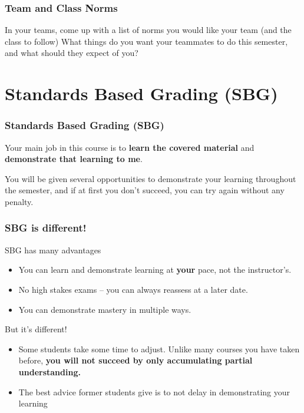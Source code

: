 \documentclass[aspectration=1610]{beamer}
\begin{document}
\begin{frame}\frametitle{Team and Class Norms}

In your teams, come up with a list of norms you would like your team (and the class to follow)
\vfill
What things do you want your teammates to do this semester, and what should they expect of you?
\end{frame}

\section{Standards Based Grading (SBG)}
%
%



\begin{frame}\frametitle{Standards Based Grading (SBG)}
Your main job in this course is to \textbf{learn the covered material}
and \textbf{demonstrate that learning to me}.

\vspace{0.2in}
\pause

You will be given several opportunities to demonstrate your learning throughout
the semester, and if
at first you don't succeed, you can try again without any penalty.
\end{frame}

\begin{frame}\frametitle{SBG is different!}
SBG has many advantages
\begin{itemize}
\item You can learn and demonstrate learning at \textbf{your} pace, not the instructor's.
\item No high stakes exams -- you can always reassess at a later date.
\item You can demonstrate mastery in multiple ways.
\end{itemize}
\vfill
But it's different!
\begin{itemize}
\item Some students take some time to adjust.  Unlike many courses you have taken before, \textbf{you will not succeed by only accumulating partial understanding.}
\item The best advice former students give is to not delay in demonstrating your learning
\end{itemize}
\end{frame}
\end{document}
